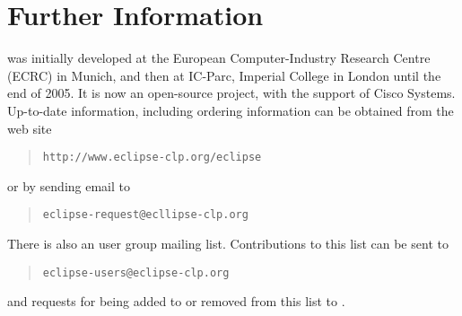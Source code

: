 
\section{Further Information}
{\eclipse} was initially developed at the European Computer-Industry
Research Centre (ECRC) in Munich, and then at IC-Parc, Imperial College in London
until the end of 2005. It is now an open-source project, with the
support of Cisco Systems.
Up-to-date information, including ordering information can be obtained from
the {\eclipse} web site
\begin{quote}
\begin{verbatim}
http://www.eclipse-clp.org/eclipse
\end{verbatim}
\end{quote}
or by sending email to
\begin{quote}
\begin{verbatim}
eclipse-request@ecllipse-clp.org
\end{verbatim}
\end{quote}
There is also an {\eclipse} user group mailing list.%
%
Contributions to this list can be sent to
\begin{quote}
\begin{verbatim}
eclipse-users@eclipse-clp.org
\end{verbatim}
\end{quote}
and requests for being added to or removed from this list to
.


